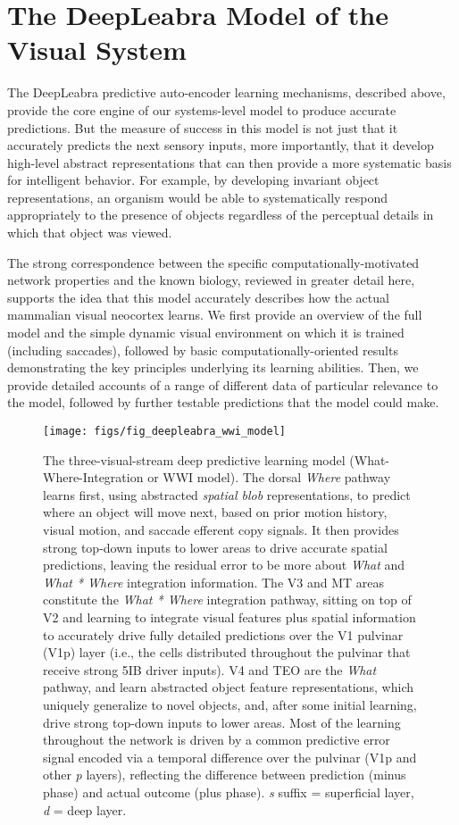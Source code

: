 \documentclass[11pt,twoside]{article}
\newif\myifpdf
\begin{document}
\section{The DeepLeabra Model of the Visual System}

The DeepLeabra predictive auto-encoder learning mechanisms, described above, provide the core engine of our systems-level model to produce accurate predictions. But the measure of success in this model is not just that it accurately predicts the next sensory inputs, more importantly, that it develop high-level abstract representations that can then provide a more systematic basis for intelligent behavior.  For example, by developing invariant object representations, an organism would be able to systematically respond appropriately to the presence of objects regardless of the perceptual details in which that object was viewed.

The strong correspondence between the specific computationally-motivated network properties and the known biology, reviewed in greater detail here, supports the idea that this model accurately describes how the actual mammalian visual neocortex learns.  We first provide an overview of the full model and the simple dynamic visual environment on which it is trained (including saccades), followed by basic computationally-oriented results demonstrating the key principles underlying its learning abilities.  Then, we provide detailed accounts of a range of different data of particular relevance to the model, followed by further testable predictions that the model could make.

\begin{figure}
  \centering\texttt{[image: figs/fig\_deepleabra\_wwi\_model]}
  \caption{\footnotesize The three-visual-stream deep predictive learning model (What-Where-Integration or WWI model). The dorsal {\em Where} pathway learns first, using abstracted {\em spatial blob} representations, to predict where an object will move next, based on prior motion history, visual motion, and saccade efferent copy signals.  It then provides strong top-down inputs to lower areas to drive accurate spatial predictions, leaving the residual error to be more about {\em What} and {\em What * Where} integration information.  The V3 and MT areas constitute the {\em What * Where} integration pathway, sitting on top of V2 and learning to integrate visual features plus spatial information to accurately drive fully detailed predictions over the V1 pulvinar (V1p) layer (i.e., the cells distributed throughout the pulvinar that receive strong 5IB driver inputs).  V4 and TEO are the {\em What} pathway, and learn abstracted object feature representations, which uniquely generalize to novel objects, and, after some initial learning, drive strong top-down inputs to lower areas.  Most of the learning throughout the network is driven by a common predictive error signal encoded via a temporal difference over the pulvinar (V1p and other {\em p} layers), reflecting the difference between prediction (minus phase) and actual outcome (plus phase). {\em s} suffix = superficial  layer, {\em d} = deep layer.}
  \label{fig.wwi_model}
\end{figure}
\end{document}
